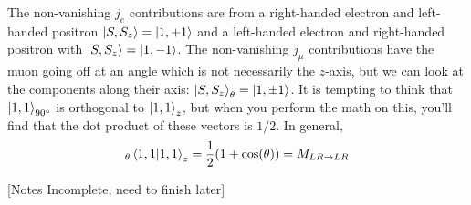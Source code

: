 \documentclass[a4paper,twoside,master.tex]{subfiles}
\begin{document}
The non-vanishing $ j_e $ contributions are from a right-handed electron and left-handed positron $\ket{S, S_z} =\ket{1, +1} $ and a left-handed electron and right-handed positron with $\ket{S, S_z} =\ket{1, -1} $. The non-vanishing $ j_{\mu} $ contributions have the muon going off at an angle which is not necessarily the $ z $-axis, but we can look at the components along their axis: $\ket{S, S_z}_{\theta} =\ket{1, \pm 1} $. It is tempting to think that $\ket{1, 1}_{90^{\circ}} $ is orthogonal to $\ket{1,1}_{z} $, but when you perform the math on this, you'll find that the dot product of these vectors is $ 1/2 $. In general,
\begin{equation}
    {}_{\theta}\bra{1,1}\ket{1,1}_z = \frac{1}{2} (1 + \cos(\theta)) = M_{LR \to LR}
\end{equation}

[Notes Incomplete, need to finish later]
\end{document}

